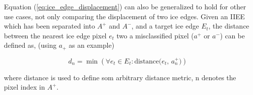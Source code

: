 \documentclass[../main/thesis.tex]{subfiles}
\begin{document}
Equation (\ref{eq:ice_edge_displacement}) can also be generalized to hold for other use cases, not only comparing the displacement of two ice edges. Given an IIEE which has been separated into $A^+$ and $A^-$, and a target ice edge $E_t$, the distance between the nearest ice edge pixel $e_t$ two a misclassified pixel ($a^+$ or $a^-$) can be defined as, (using $a_+$ as an example)

\begin{equation}
    d_n = \min{\left(\forall e_t \in E_t : \text{distance($e_t$, $a_n^+$)}\right)}
\end{equation}

where distance is used to define som arbitrary distance metric, n denotes the pixel index in $A^+$. 

\biblio
\end{document}
